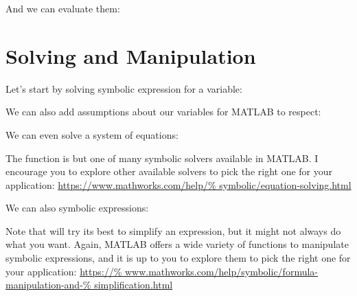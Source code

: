 \documentclass{article}
\begin{document}
And we can evaluate them:


\section{Solving and Manipulation}

Let's start by solving symbolic expression for a variable:


We can also add assumptions about our variables for MATLAB to respect:


We can even solve a system of equations:


The  function is but one of many symbolic solvers available in
MATLAB.  I encourage you to explore other available solvers to pick the
right one for your application: \url{https://www.mathworks.com/help/%
symbolic/equation-solving.html}

We can also  symbolic expressions:


\newpage

Note that  will try its best to simplify an expression, but it
might not always do what you want.  Again, MATLAB offers a wide variety
of functions to manipulate symbolic expressions, and it is up to you to
explore them to pick the right one for your application: \url{https://%
www.mathworks.com/help/symbolic/formula-manipulation-and-%
simplification.html}
\end{document}
